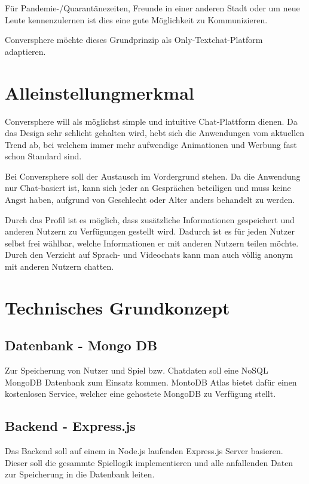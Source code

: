\documentclass[conference]{IEEEtran}
\begin{document}
	Für Pandemie-/Quarantänezeiten, Freunde in einer anderen Stadt oder um neue Leute kennenzulernen ist dies eine gute Möglichkeit zu Kommunizieren.
	
	Conversphere möchte dieses Grundprinzip als Only-Textchat-Platform adaptieren.
	\ \\

	\section{Alleinstellungmerkmal}
	Conversphere will als möglichst simple und intuitive Chat-Plattform dienen. Da das Design sehr schlicht gehalten wird, hebt sich die Anwendungen vom aktuellen Trend ab, bei welchem immer mehr aufwendige Animationen und Werbung fast schon Standard sind.
	
	Bei Conversphere soll der Austausch im Vordergrund stehen. Da die Anwendung nur Chat-basiert ist, kann sich jeder an Gesprächen beteiligen und muss keine Angst haben, aufgrund von Geschlecht oder Alter anders behandelt zu werden.
	
	Durch das Profil ist es möglich, dass zusätzliche Informationen gespeichert und anderen Nutzern zu Verfügungen gestellt wird. Dadurch ist es für jeden Nutzer selbst frei wählbar, welche Informationen er mit anderen Nutzern teilen möchte. Durch den Verzicht auf Sprach- und Videochats kann man auch völlig anonym mit anderen Nutzern chatten.
	\ \\

	\section{Technisches Grundkonzept}
	\subsection{Datenbank - Mongo DB}
	Zur Speicherung von Nutzer und Spiel bzw. Chatdaten soll eine NoSQL MongoDB Datenbank zum Einsatz kommen. MontoDB Atlas bietet dafür einen kostenlosen Service, welcher eine gehostete MongoDB zu Verfügung stellt.

	\subsection{Backend - Express.js}
	Das Backend soll auf einem in Node.js laufenden Express.js Server basieren. Dieser soll die gesammte Spiellogik implementieren und alle anfallenden Daten zur Speicherung in die Datenbank leiten.
\end{document}
